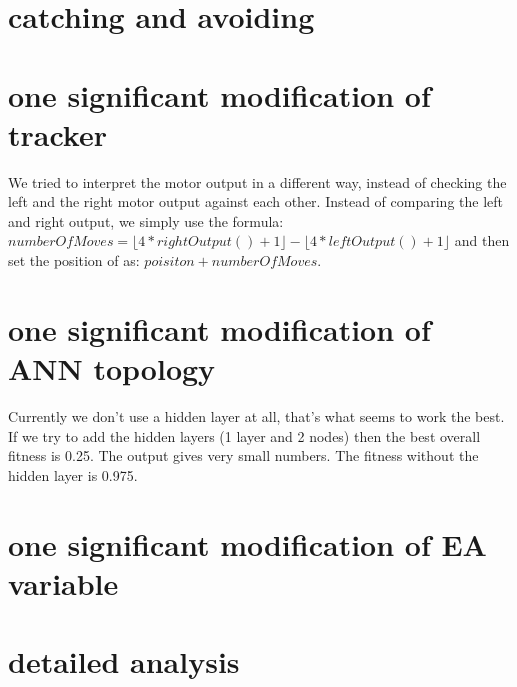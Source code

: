 \documentclass[12pt, a4paper]{article}
\begin{document}
\section{catching and avoiding}

\section{one significant modification of tracker}
We tried to interpret the motor output in a different way, instead of checking the left and the right motor output against each other. Instead of comparing the left and right output, we simply use the formula:\\ $numberOfMoves = \lfloor 4*rightOutput()+1 \rfloor - \lfloor 4*leftOutput()+1 \rfloor$
and then set the position of as: $ poisiton + numberOfMoves $.

\section{one significant modification of ANN topology}
Currently we don't use a hidden layer at all, that's what seems to work the best. If we try to add the hidden layers (1 layer and 2 nodes) then the best overall fitness is 0.25. The output gives very small numbers. The fitness without the hidden layer is 0.975. 
\section{one significant modification of EA variable}


\section{detailed analysis}
\end{document}
